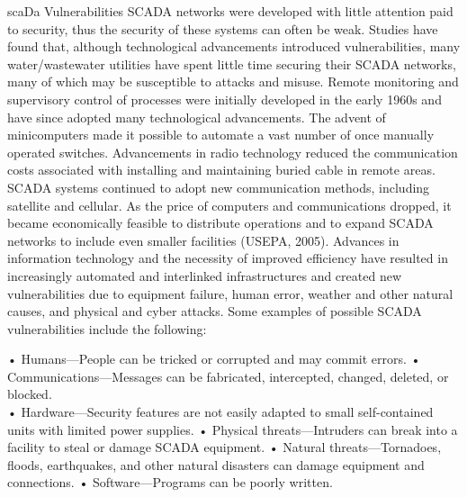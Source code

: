 \documentclass{article}
\begin{document}
scaDa Vulnerabilities SCADA networks were developed with little
attention paid to security, thus the security of these systems can often
be weak. Studies have found that, although technological advancements
introduced vulnerabilities, many water/wastewater utilities have spent
little time securing their SCADA networks, many of which may be
susceptible to attacks and misuse. Remote monitoring and supervisory
control of processes were initially developed in the early 1960s and
have since adopted many technological advancements. The advent of
minicomputers made it possible to automate a vast number of once
manually operated switches. Advancements in radio technology reduced the
communication costs associated with installing and maintaining buried
cable in remote areas. SCADA systems continued to adopt new
communication methods, including satellite and cellular. As the price of
computers and communications dropped, it became economically feasible to
distribute operations and to expand SCADA networks to include even
smaller facilities (USEPA, 2005). Advances in information technology and
the necessity of improved efficiency have resulted in increasingly
automated and interlinked infrastructures and created new
vulnerabilities due to equipment failure, human error, weather and other
natural causes, and physical and cyber attacks. Some examples of
possible SCADA vulnerabilities include the following:

• Humans---People can be tricked or corrupted and may commit errors. •
Communications---Messages can be fabricated, intercepted, changed,
deleted, or blocked.\\
• Hardware---Security features are not easily adapted to small
self-contained units with limited power supplies. • Physical
threats---Intruders can break into a facility to steal or damage SCADA
equipment. • Natural threats---Tornadoes, floods, earthquakes, and other
natural disasters can damage equipment and connections. •
Software---Programs can be poorly written.
\end{document}

